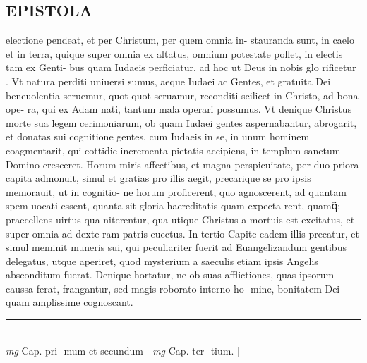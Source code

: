\documentclass{article}
\begin{document}
\begin{pages}
\section*{EPISTOLA }\pstart electione pendeat, et per Christum, per quem omnia in- stauranda sunt, in caelo et in terra, quique super omnia ex altatus, omnium potestate pollet, in electis tam ex Genti- bus quam Iudaeis perficiatur, ad hoc ut Deus in nobis glo rificetur .  Vt natura perditi uniuersi sumus, aeque Iudaei ac Gentes, et gratuita Dei beneuolentia seruemur, quot quot seruamur, reconditi scilicet in Christo, ad bona ope- ra, qui ex Adam nati, tantum mala operari possumus.  Vt denique Christus morte sua legem cerimoniarum, ob quam Iudaei gentes aspernabantur, abrogarit, et donatas sui cognitione gentes, cum Iudaeis in se, in unum hominem coagmentarit, qui cottidie incrementa pietatis accipiens, in templum sanctum Domino cresceret.   \pend\pstart Horum miris affectibus, et magna perspicuitate, per duo priora capita admonuit, simul et gratias pro illis aegit, precarique se pro ipsis memorauit, ut in cognitio- ne horum proficerent, quo agnoscerent, ad quantam spem uocati essent, quanta sit gloria haereditatis quam expecta rent, quamꝗ̃; praecellens uirtus qua niterentur, qua utique Christus a mortuis est excitatus, et super omnia ad dexte ram patris euectus.  In tertio Capite eadem illis precatur, et simul meminit muneris sui, qui peculiariter fuerit ad Euangelizandum gentibus delegatus, utque aperiret, quod mysterium a saeculis etiam ipsis Angelis absconditum fuerat.  Denique hortatur, ne ob suas afflictiones, quas ipsorum caussa ferat, frangantur, sed magis roborato interno ho- mine, bonitatem Dei quam amplissime cognoscant.   \pend
\vspace{0.5cm}\noindent
\vspace{0.2cm}\rule{1cm}{0.2pt}\\ 
\hspace{0.2cm}\textit{mg}
\footnotesize Cap. pri- mum et secundum 
\normalsize| 
\hspace{0.2cm}\textit{mg}
\footnotesize Cap.  ter- tium.  
\normalsize| 

\end{pages}
\end{document}
